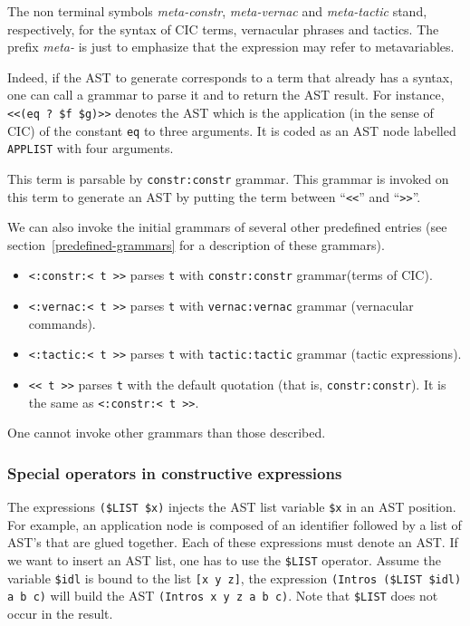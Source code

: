 {The non terminal symbols {\sl meta-constr}, {\sl meta-vernac} and
{\sl meta-tactic} stand, respectively, for the syntax of CIC terms,
vernacular phrases and tactics. The prefix {\sl meta-} is just to
emphasize that the expression may refer to metavariables.

Indeed, if the AST to generate corresponds to a term that already has
a syntax, one can call a grammar to parse it and to return the AST
result. For instance, \verb+<<(eq ? $f $g)>>+ denotes the AST which is
the application (in the sense of CIC) of the constant {\tt eq} to
three arguments. It is coded as an AST node labelled {\tt APPLIST}
with four arguments.

This term is parsable by \verb+constr:constr+ grammar. This grammar
is invoked on this term to generate an AST by putting the term between
``\verb+<<+'' and ``\verb+>>+''.

We can also invoke the initial grammars of several other predefined
entries (see section~\ref{predefined-grammars} for a description of
these grammars).

\begin{itemize}
\item \verb|<:constr:< t >>| parses {\tt t} with {\tt constr:constr}
  grammar(terms of CIC).
\item \verb|<:vernac:< t >>| parses {\tt t} with {\tt vernac:vernac}
  grammar (vernacular commands).
\item \verb|<:tactic:< t >>| parses {\tt t} with {\tt tactic:tactic}
  grammar (tactic expressions).
\item \verb|<< t >>| parses {\tt t} with the default quotation (that
  is, {\tt constr:constr}). It is the same as \verb|<:constr:< t >>|.
\end{itemize}

\Warning
One cannot invoke other grammars than those described.

\subsubsection{Special operators in constructive expressions}

The expressions \verb+($LIST $x)+ injects the AST list variable
{\tt\$x} in an AST position. For example, an application node is
composed of an identifier followed by a list of AST's that are glued
together. Each of these expressions must denote an AST. If we want to
insert an AST list, one has to use the \verb+$LIST+ operator. Assume
the variable \verb+$idl+ is bound to the list \verb+[x y z]+, the
expression \verb+(Intros ($LIST $idl) a b c)+ will build the AST
\verb+(Intros x y z a b c)+. Note that \verb+$LIST+ does not occur in
the result.

}
